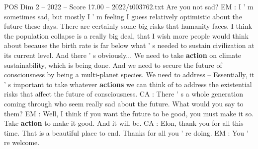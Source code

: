 \begin{textsample}{POS Dim 2 – 2022 – Score 17.00 – 2022/t003762.txt}
Are you not sad?
EM : I ' m sometimes sad, but mostly I ' m feeling I guess relatively optimistic about the future these days.
There are certainly some big risks that humanity faces.
I think the population collapse is a really big deal, that I wish more people would think about because the birth rate is far below what ' s needed to sustain civilization at its current level.
And there ' s obviously...
We need to take \textbf{action} on climate sustainability, which is being done.
And we need to secure the future of consciousness by being a multi-planet species.
We need to address -- Essentially, it ' s important to take whatever \textbf{actions} we can think of to address the existential risks that affect the future of consciousness.
CA : There ' s a whole generation coming through who seem really sad about the future.
What would you say to them?
EM : Well, I think if you want the future to be good, you must make it so.
Take \textbf{action} to make it good.
And it will be.
CA : Elon, thank you for all this time.
That is a beautiful place to end.
Thanks for all you ' re doing.
EM : You ' re welcome.

\end{textsample}
